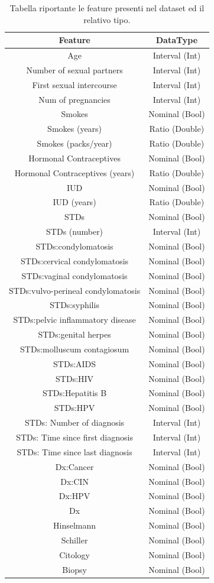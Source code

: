 \begin{table}
	\centering
	\caption{Tabella riportante le feature presenti nel dataset ed il relativo tipo.}
	\label{tab:attributes}
	\begin{tabular}{|c|c|}
		\toprule 
		Feature & DataType \\ 
		\midrule 
		Age & Interval (Int) \\ 
		Number of sexual partners & Interval (Int) \\ 
		First sexual intercourse & Interval (Int) \\ 
		Num of pregnancies & Interval (Int) \\
		Smokes & Nominal (Bool) \\
		Smokes (years) & Ratio (Double) \\ 
		Smokes (packs/year) & Ratio (Double) \\ 
		Hormonal Contraceptives & Nominal (Bool) \\ 
		Hormonal Contraceptives (years) & Ratio (Double) \\ 
		IUD & Nominal (Bool) \\ 
		IUD (years) & Ratio (Double) \\ 
		STDs & Nominal (Bool) \\ 
		STDs (number) & Interval (Int) \\ 
		STDs:condylomatosis & Nominal (Bool) \\ 
		STDs:cervical condylomatosis & Nominal (Bool) \\ 
		STDs:vaginal condylomatosis & Nominal (Bool) \\ 
		STDs:vulvo-perineal condylomatosis & Nominal (Bool) \\ 
		STDs:syphilis & Nominal (Bool) \\ 
		STDs:pelvic inflammatory disease & Nominal (Bool) \\ 
		STDs:genital herpes & Nominal (Bool) \\ 
		STDs:molluscum contagiosum & Nominal (Bool) \\ 
		STDs:AIDS & Nominal (Bool) \\ 
		STDs:HIV & Nominal (Bool) \\ 
		STDs:Hepatitis B & Nominal (Bool) \\ 
		STDs:HPV & Nominal (Bool) \\ 
		STDs: Number of diagnosis & Interval (Int) \\
		STDs: Time since first diagnosis & Interval (Int) \\ 
		STDs: Time since last diagnosis & Interval (Int) \\ 
		Dx:Cancer & Nominal (Bool) \\ 
		Dx:CIN & Nominal (Bool) \\ 
		Dx:HPV & Nominal (Bool) \\ 
		Dx & Nominal (Bool) \\ 
		Hinselmann & Nominal (Bool) \\ 
		Schiller & Nominal (Bool) \\
		Citology & Nominal (Bool) \\ 
		Biopsy & Nominal (Bool) \\ 
		\bottomrule 
	\end{tabular} 
\end{table}

